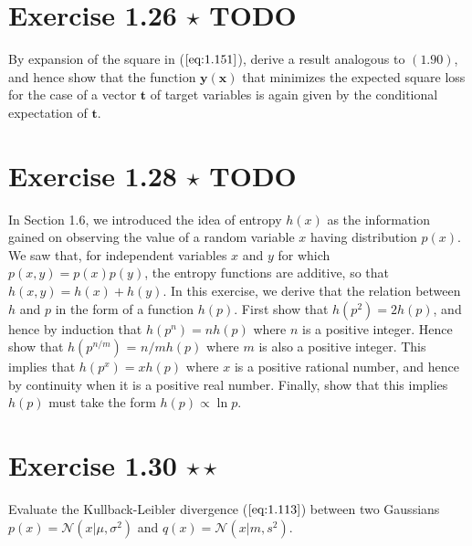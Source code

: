 \section*{Exercise 1.26 $\star$ TODO}
By expansion of the square in ($\ref{eq:1.151}$), derive a result analogous to
$(1.90)$, and hence show that the function $\mathbf{y}(\mathbf{x})$ that
minimizes the expected square loss for the case of a vector $\mathbf{t}$ 
of target variables is again given by the conditional expectation of $\mathbf{t}$.

\section*{Exercise 1.28 $\star$ TODO}
In Section 1.6, we introduced the idea of entropy $h(x)$ as the information
gained on observing the value of a random variable  $x$ having distribution
$p(x)$. We saw that, for independent variables $x$ and $y$ for which
$p(x, y) = p(x)p(y)$, the entropy functions are additive, so that 
$h(x, y) = h(x) + h(y)$. In this exercise, we derive that the relation
between $h$ and  $p$ in the form of a function  $h(p)$. First show that
$h(p^2) = 2h(p)$, and hence by induction that $h(p^n) = nh(p)$ where
$n$ is a positive integer. Hence show that $h(p^{n/m})$ = $n/m h(p)$
where $m$ is also a positive integer. This implies that $h(p^x) = xh(p)$ where
$x$ is a positive rational number, and hence by continuity when it is
a positive real number. Finally, show that this implies $h(p)$ must take
the form  $h(p) \propto \ln p$.

\vspace{1em}

\section*{Exercise 1.30 $\star \star$}
Evaluate the Kullback-Leibler divergence ($\ref{eq:1.113}$) between two Gaussians
$p(x) = \mathcal{N}(x | \mu, \sigma^2)$ and $q(x) = \mathcal{N}(x | m, s^2)$.

\vspace{1em}

